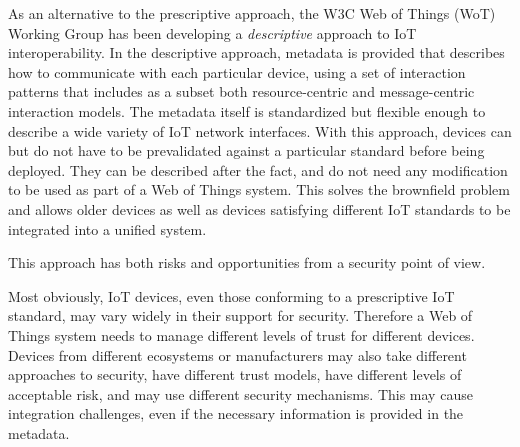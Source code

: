 As an alternative to the prescriptive approach,
the W3C Web of Things (WoT) Working Group has been developing a \emph{descriptive} 
approach to IoT interoperability.
In the descriptive approach,
metadata is provided that describes how to communicate with each particular device,
using a set of interaction patterns that includes as a subset both resource-centric
and message-centric interaction models.
The metadata itself is standardized but flexible enough to describe a wide variety of
IoT network interfaces.
With this approach,
devices can but do not have to be prevalidated against 
a particular standard before being deployed.
They can be described after the fact,
and do not need any modification to be
used as part of a Web of Things system.
This solves the brownfield problem and allows
older devices as well as devices satisfying different IoT 
standards to be integrated into a unified system.  

This approach has both risks and opportunities from a security point of view.

Most obviously, IoT devices, even those conforming to a prescriptive IoT standard,
may vary widely in their support for security.
Therefore a Web of Things system
needs to manage different levels of trust for different devices.
Devices from different ecosystems or manufacturers may also take different approaches to
security, have different trust models, have different levels of acceptable risk,
and may use different security mechanisms. 
This may cause integration challenges, even if the necessary
information is provided in the metadata.

